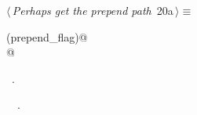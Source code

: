 \documentclass[a4paper]{report}
\begin{document}
\begin{flushleft} \small
\begin{minipage}{\linewidth}\label{scrap26}\raggedright\small
{} $\langle\,${\it Perhaps get the prepend path}\nobreak\ {\footnotesize {20a}}$\,\rangle\equiv$
\vspace{-1ex}
\begin{list}{}{} \item
\mbox{}\verb@if (prepend_flag)@\\
\mbox{}@\\
\mbox{}\verb@@{\NWsep}
\end{list}
\vspace{-1.5ex}
\footnotesize
\begin{list}{}{\setlength{\itemsep}{-\parsep}\setlength{\itemindent}{-\leftmargin}}
\item \NWtxtMacroRefIn\ .
\item \NWtxtIdentsUsed\nobreak\  \verb@FALSE@\nobreak\ .
\item{}
\end{list}
\end{minipage}\vspace{4ex}
\end{flushleft}
\end{document}
